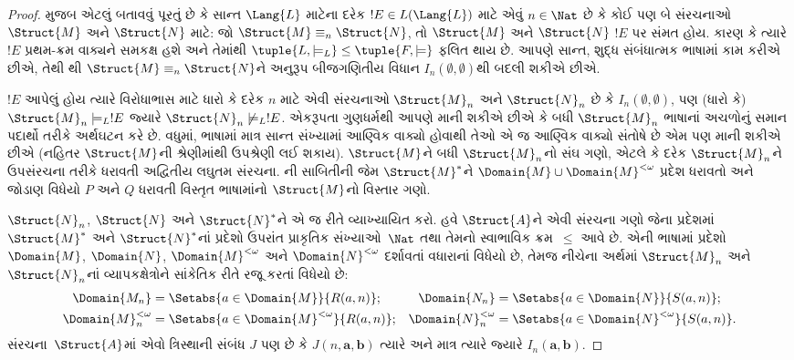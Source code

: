\begin{proof}
 મુજબ એટલું બતાવવું પૂરતું છે કે સાન્ત
$\Lang{L}$ માટેના દરેક $!E \in L(\Lang{L})$ માટે એવું $n \in \Nat$
છે કે કોઈ પણ બે સંરચનાઓ $\Struct{M}$ અને $\Struct{N}$ માટે: જો
$\Struct{M} \equiv_n \Struct{N}$, તો $\Struct{M}$ અને $\Struct{N}$
$!E$ પર સંમત હોય. કારણ કે ત્યારે $!E$ પ્રથમ-ક્રમ વાક્યને સમકક્ષ
હશે અને તેમાંથી $\tuple{L, \models_L} \le \tuple{F, \models}$
ફલિત થાય છે. આપણે સાન્ત, શુદ્ધ સંબંધાત્મક ભાષામાં કામ કરીએ
છીએ, તેથી થી $\Struct{M} \equiv_n
\Struct{N}$ને અનુરૂપ બીજગણિતીય વિધાન $I_n(\emptyset,\emptyset)$થી
બદલી શકીએ છીએ.

$!E$ આપેલું હોય ત્યારે વિરોધાભાસ માટે ધારો કે દરેક $n$ માટે એવી
સંરચનાઓ $\Struct{M}_n$ અને $\Struct{N}_n$ છે કે
$I_n(\emptyset, \emptyset)$, પણ (ધારો કે) $\Struct{M}_n \models_L !E$
જ્યારે $\Struct{N}_n \not\models_L !E$. એકરૂપતા ગુણધર્મથી આપણે માની
શકીએ છીએ કે બધી $\Struct{M}_n$ ભાષાનાં અચળોનું સમાન પદાર્થો તરીકે
અર્થઘટન કરે છે. વધુમાં, ભાષામાં માત્ર સાન્ત સંખ્યામાં આણ્વિક
વાક્યો હોવાથી તેઓ એ જ આણ્વિક વાક્યો સંતોષે છે એમ પણ
માની શકીએ છીએ (નહિતર $\Struct{M}$ની શ્રેણીમાંથી ઉપશ્રેણી લઈ શકાય).
$\Struct{M}$ને બધી $\Struct{M}_n$નો સંઘ ગણો, એટલે કે દરેક
$\Struct{M}_n$ને ઉપસંરચના તરીકે ધરાવતી અદ્વિતીય લઘુતમ સંરચના.
ની સાબિતીની જેમ $\Struct{M}^*$ને
$\Domain{M} \cup \Domain{M}^{<\omega}$ પ્રદેશ ધરાવતો અને જોડાણ
વિધેયો $P$ અને $Q$ ધરાવતી વિસ્તૃત ભાષામાંનો
$\Struct{M}$નો વિસ્તાર ગણો.

$\Struct{N}_n$, $\Struct{N}$ અને $\Struct{N}^*$ને એ જ રીતે વ્યાખ્યાયિત
કરો. હવે $\Struct{A}$ને એવી સંરચના ગણો જેના પ્રદેશમાં
$\Struct{M}^*$ અને $\Struct{N}^*$નાં પ્રદેશો ઉપરાંત પ્રાકૃતિક
સંખ્યાઓ~$\Nat$ તથા તેમનો સ્વાભાવિક ક્રમ~$\le$ આવે છે. એની
ભાષામાં પ્રદેશો $\Domain{M}$, $\Domain{N}$,
$\Domain{M}^{<\omega}$ અને $\Domain{N}^{<\omega}$ દર્શાવતાં વધારાનાં
વિધેયો છે, તેમજ નીચેના અર્થમાં $\Struct{M}_n$ અને
$\Struct{N}_n$નાં વ્યાપકક્ષેત્રોને સાંકેતિક રીતે રજૂ કરતાં
વિધેયો છે:
\begin{align*}
  \Domain{M_n} & = \Setabs{a \in \Domain{M}}{R(a, n)}; &
  \Domain{N_n} & = \Setabs{a \in \Domain{N}}{S(a,n)}; \\
  \Domain{M}^{<\omega}_n & = \Setabs{a \in \Domain{M}^{<\omega}}{R(a,n)}; &
  \Domain{N}^{<\omega}_n & = \Setabs{a \in \Domain{N}^{<\omega}}{S(a,n)}.
\end{align*}
સંરચના~$\Struct{A}$માં એવો ત્રિસ્થાની સંબંધ $J$ પણ છે કે
$J(n, \mathbf{a}, \mathbf{b})$ ત્યારે અને માત્ર ત્યારે જ્યારે
$I_n(\mathbf{a}, \mathbf{b})$.


\end{proof}
